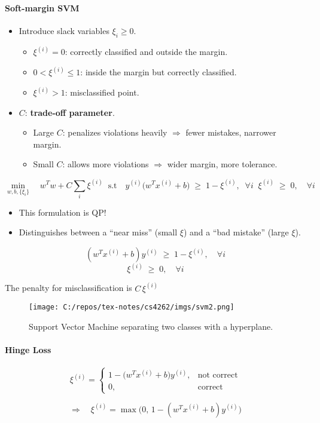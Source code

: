 \documentclass[11pt]{article}
\begin{document}
\paragraph*{Soft-margin SVM}

\begin{itemize}
    \item Introduce slack variables $\xi_i \geq 0$.
        \begin{itemize}
            \item $\xi^{(i)} = 0$: correctly classified and outside the margin.
            \item $0 < \xi^{(i)} \leq 1$: inside the margin but correctly classified.
            \item $\xi^{(i)} > 1$: misclassified point.
        \end{itemize}
    \item $C$: \textbf{trade-off parameter}.
        \begin{itemize}
            \item Large $C$: penalizes violations heavily $\Rightarrow$ fewer mistakes, narrower margin.
            \item Small $C$: allows more violations $\Rightarrow$ wider margin, more tolerance.
        \end{itemize}
\end{itemize}


\[
 \min_{w,b,\{\xi_i\}} \quad w^T w + C \sum_i \xi^{(i)} \; \; \text{s.t} \quad y^{(i)} \big(w^T x^{(i)} + b\big) \;\geq\; 1 - \xi^{(i)}, \; \; \forall i \;\; \xi^{(i)} \;\geq\; 0, \quad \forall i
\]

\begin{itemize}
    \item This formulation is QP!
    \item Distinguishes between a ``near miss'' (small $\xi$) and a ``bad mistake'' (large $\xi$).
\end{itemize}

\[
(w^T x^{(i)} + b) y^{(i)} \;\geq\; 1 - \xi^{(i)}, \quad \forall i
\]
\[
\xi^{(i)} \;\geq\; 0, \quad \forall i
\]

The penalty for misclassification is $C \, \xi^{(i)}$

\begin{figure}[h!]
\centering
\texttt{[image: C:/repos/tex-notes/cs4262/imgs/svm2.png]}
\caption{Support Vector Machine separating two classes with a hyperplane.}
\end{figure}

\paragraph*{Hinge Loss}
\[
\xi^{(i)} =
\begin{cases}
1 - \big(w^T x^{(i)} + b\big)y^{(i)}, & \text{not correct} \\[6pt]
0, & \text{correct}
\end{cases}
\]

\[
\Longrightarrow \quad \xi^{(i)} = \max \big(0, \, 1 - (w^T x^{(i)} + b)y^{(i)}\big)
\]
\end{document}
